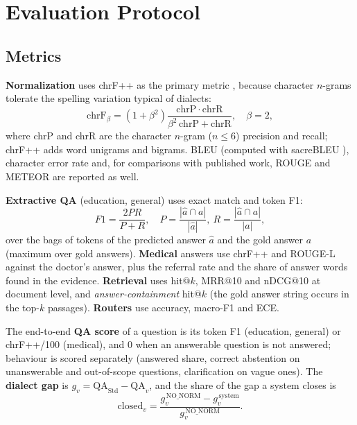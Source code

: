 \section{Evaluation Protocol}
\label{sec:eval}

\subsection{Metrics}
\textbf{Normalization} uses chrF++ as the primary metric \cite{popovic2017chrfpp}, because character $n$-grams tolerate the spelling variation typical of dialects:
\begin{equation}
\mathrm{chrF}_\beta=(1+\beta^2)\frac{\mathrm{chrP}\cdot\mathrm{chrR}}{\beta^2\,\mathrm{chrP}+\mathrm{chrR}},\quad\beta=2,
\end{equation}
where chrP and chrR are the character $n$-gram ($n\le6$) precision and recall; chrF++ adds word unigrams and bigrams. BLEU \cite{papineni2002bleu} (computed with sacreBLEU \cite{post2018sacrebleu}), character error rate and, for comparisons with published work, ROUGE \cite{lin2004rouge} and METEOR \cite{banerjee2005meteor} are reported as well.

\textbf{Extractive QA} (education, general) uses exact match and token F1:
\begin{equation}
F1=\frac{2PR}{P+R},\quad P=\frac{|\hat a\cap a|}{|\hat a|},\ R=\frac{|\hat a\cap a|}{|a|},
\end{equation}
over the bags of tokens of the predicted answer $\hat a$ and the gold answer $a$ (maximum over gold answers). \textbf{Medical} answers use chrF++ and ROUGE-L against the doctor's answer, plus the referral rate and the share of answer words found in the evidence. \textbf{Retrieval} uses hit@$k$, MRR@10 and nDCG@10 at document level, and \emph{answer-containment} hit@$k$ (the gold answer string occurs in the top-$k$ passages). \textbf{Routers} use accuracy, macro-F1 and ECE.

The end-to-end \textbf{QA score} of a question is its token F1 (education, general) or chrF++/100 (medical), and 0 when an answerable question is not answered; behaviour is scored separately (answered share, correct abstention on unanswerable and out-of-scope questions, clarification on vague ones). The \textbf{dialect gap} is $g_v=\mathrm{QA}_{\mathrm{Std}}-\mathrm{QA}_v$, and the share of the gap a system closes is
\begin{equation}
\mathrm{closed}_v=\frac{g_v^{\,\mathrm{NO\_NORM}}-g_v^{\,\mathrm{system}}}{g_v^{\,\mathrm{NO\_NORM}}}.
\end{equation}

